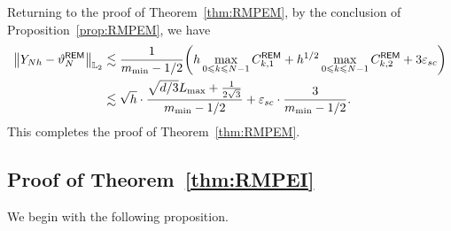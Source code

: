 Returning to the proof of Theorem~\ref{thm:RMPEM}, by the conclusion of Proposition~\ref{prop:RMPEM}, we have
\begin{align*}
    \l|Y_{Nh}-\vartheta_N^{\sf REM}\r|_{\Ltwo}
    &\lesssim \dfrac{1}{m_{\min}-1/2}\left(h\max_{0\leqslant k\leqslant N-1}C_{k,1}^{\sf REM}+h^{1/2}\max_{0\leqslant k\leqslant N-1}C_{k,2}^{\sf REM}+3\varepsilon_{sc}\right)\\
    &\lesssim \sqrt{h}\cdot\dfrac{\sqrt{d/3}L_{\max}+\frac{1}{2\sqrt{3}}}{m_{\min}-1/2}+\varepsilon_{sc}\cdot\dfrac{3}{m_{\min}-1/2}.
\end{align*}
This completes the proof of Theorem~\ref{thm:RMPEM}.


\subsection{Proof of Theorem~\ref{thm:RMPEI}}
\label{proof:RMPEI}
We begin with the following proposition.
